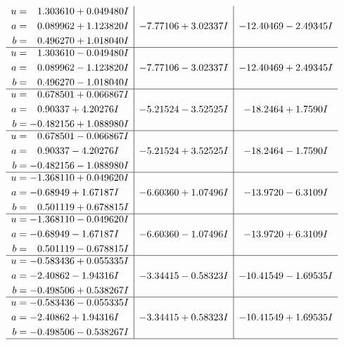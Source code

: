 \documentclass[1p]{elsarticle_modified}
\theoremstyle{definition}
\begin{document}
$$\begin{array}{c|c|c}
\begin{aligned}
u &= \phantom{-}1.303610 + 0.049480 I \\
a &= \phantom{-}0.089962 + 1.123820 I \\
b &= \phantom{-}0.496270 + 1.018040 I\end{aligned}
 & -7.77106 + 3.02337 I & -12.40469 - 2.49345 I \\ \hline\begin{aligned}
u &= \phantom{-}1.303610 - 0.049480 I \\
a &= \phantom{-}0.089962 - 1.123820 I \\
b &= \phantom{-}0.496270 - 1.018040 I\end{aligned}
 & -7.77106 - 3.02337 I & -12.40469 + 2.49345 I \\ \hline\begin{aligned}
u &= \phantom{-}0.678501 + 0.066867 I \\
a &= \phantom{-}0.90337 + 4.20276 I \\
b &= -0.482156 + 1.088980 I\end{aligned}
 & -5.21524 - 3.52525 I & -18.2464 + 1.7590 I \\ \hline\begin{aligned}
u &= \phantom{-}0.678501 - 0.066867 I \\
a &= \phantom{-}0.90337 - 4.20276 I \\
b &= -0.482156 - 1.088980 I\end{aligned}
 & -5.21524 + 3.52525 I & -18.2464 - 1.7590 I \\ \hline\begin{aligned}
u &= -1.368110 + 0.049620 I \\
a &= -0.68949 + 1.67187 I \\
b &= \phantom{-}0.501119 + 0.678815 I\end{aligned}
 & -6.60360 + 1.07496 I & -13.9720 - 6.3109 I \\ \hline\begin{aligned}
u &= -1.368110 - 0.049620 I \\
a &= -0.68949 - 1.67187 I \\
b &= \phantom{-}0.501119 - 0.678815 I\end{aligned}
 & -6.60360 - 1.07496 I & -13.9720 + 6.3109 I \\ \hline\begin{aligned}
u &= -0.583436 + 0.055335 I \\
a &= -2.40862 - 1.94316 I \\
b &= -0.498506 + 0.538267 I\end{aligned}
 & -3.34415 - 0.58323 I & -10.41549 - 1.69535 I \\ \hline\begin{aligned}
u &= -0.583436 - 0.055335 I \\
a &= -2.40862 + 1.94316 I \\
b &= -0.498506 - 0.538267 I\end{aligned}
 & -3.34415 + 0.58323 I & -10.41549 + 1.69535 I\\
 \hline 
 \end{array}$$\newpage
\end{document}
